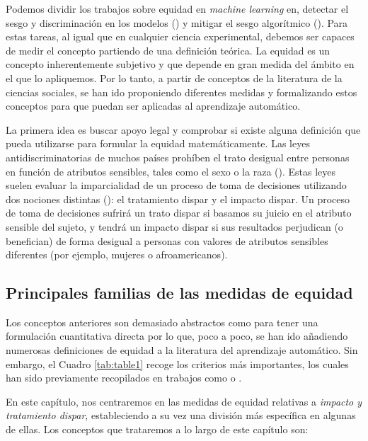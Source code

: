 \documentclass[oneside,openright,titlepage,numbers=noenddot,openany,headinclude,footinclude=true,
cleardoublepage=empty,abstractoff,BCOR=5mm,paper=a4,fontsize=12pt,main=spanish]{scrreprt}
\begin{document}
\clearpage

Podemos dividir los trabajos sobre equidad en \textit{machine learning} en, detectar el sesgo y discriminación en los modelos (\cite{detect2012}) y mitigar el sesgo algorítmico (\cite{mitigate2017}). Para estas tareas, al igual que en cualquier ciencia experimental, debemos ser capaces de medir el concepto partiendo de una definición teórica. La equidad es un concepto inherentemente subjetivo y que depende en gran medida del ámbito en el que lo apliquemos. Por lo tanto, a partir de conceptos de la literatura de la ciencias sociales, se han ido proponiendo diferentes medidas y formalizando estos conceptos para que puedan ser aplicadas al aprendizaje automático.

La primera idea es buscar apoyo legal y comprobar si existe alguna definición que pueda utilizarse para formular la equidad matemáticamente. Las leyes antidiscriminatorias de muchos países prohíben el trato desigual entre personas en función de atributos sensibles, tales como el sexo o la raza (\cite{ley1964}). Estas leyes suelen evaluar la imparcialidad de un proceso de toma de decisiones utilizando dos nociones distintas (\cite{bigdata2016}): el tratamiento dispar y el impacto dispar. Un proceso de toma de decisiones sufrirá un trato dispar si basamos su juicio en el atributo sensible del sujeto, y tendrá un impacto dispar si sus resultados perjudican (o benefician) de forma desigual a personas con valores de atributos sensibles diferentes (por ejemplo, mujeres o afroamericanos).

\subsection{Principales familias de las medidas de equidad}

Los conceptos anteriores son demasiado abstractos como para tener una formulación cuantitativa directa por lo que, poco a poco, se han ido añadiendo numerosas definiciones de equidad a la literatura del aprendizaje automático. Sin embargo, el Cuadro \ref{tab:table1} recoge los criterios más importantes, los cuales han sido previamente recopilados en trabajos como \cite{formalizing2018} o \cite{definitions2018}.  

En este capítulo, nos centraremos en las medidas de equidad relativas a \textit{impacto y tratamiento dispar}, estableciendo a su vez una división más específica en algunas de ellas. Los conceptos que trataremos a lo largo de este capítulo son:
\end{document}
